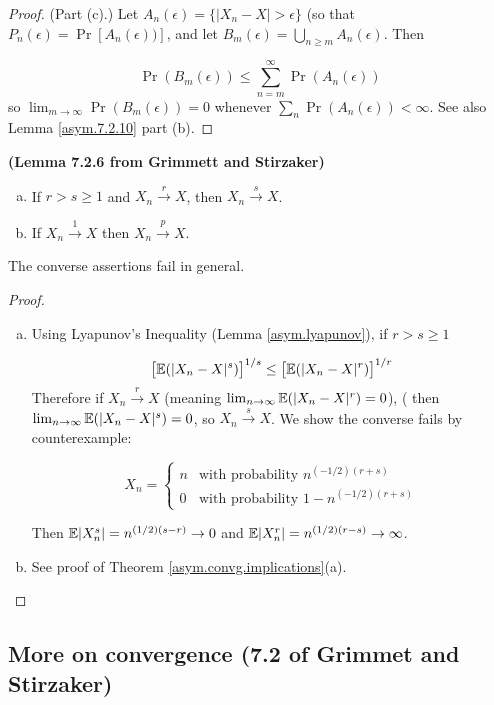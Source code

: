 \begin{proof}(Part (c).) Let \(A_n(\epsilon) = \{|X_n - X| > \epsilon\}\) (so that \(P_n(\epsilon) = \Pr[A_n(\epsilon))]\), and let \(B_m(\epsilon) = \bigcup_{n \geq m} A_n(\epsilon)\). Then

\[
\Pr(B_m(\epsilon)) \leq \sum_{n=m}^\infty \Pr(A_n(\epsilon))
\]
so \(\lim_{m \to \infty} \Pr(B_m(\epsilon)) = 0\) whenever \(\sum_n \Pr(A_n(\epsilon)) < \infty\). See also Lemma \ref{asym.7.2.10} part (b).\end{proof}

\begin{lemma}\label{asym.7.2.6} \textbf{(Lemma 7.2.6 from Grimmett and Stirzaker)} 
\begin{enumerate}[(a)]
\item If \(r > s \geq 1\) and \(X_n \xrightarrow{r} X\), then \(X_n \xrightarrow{s} X\).
\item If \(X_n \xrightarrow{1} X\) then \(X_n \xrightarrow{p} X\). 
\end{enumerate}
The converse assertions fail in general.
\end{lemma}

\begin{proof}
\begin{enumerate}[(a)]
\item
Using Lyapunov's Inequality (Lemma \ref{asym.lyapunov}), if \(r > s \geq 1\)

\[
\big[ \mathbb{E}(|X_n - X|^s) \big]^{1/s} \leq \big[ \mathbb{E}(|X_n - X|^r) \big]^{1/r}
\]
Therefore if \(X_n \xrightarrow{r} X\) (meaning \(\lim_{n \to \infty} \mathbb{E}(|X_n - X|^r) = 0\)), ( then  \(\lim_{n \to \infty} \mathbb{E}(|X_n - X|^s) = 0\), so \(X_n \xrightarrow{s} X\). We show the converse fails by counterexample:

\[
X_n = \begin{cases}
n & \text{with probability } n^{(-1/2)(r+s)} \\
0 & \text{with probability } 1 -  n^{(-1/2)(r+s)}
\end{cases}
\]

Then \(\mathbb{E}|X_n^s| = n^{(1/2)(s-r)} \to 0\) and \(\mathbb{E}|X_n^r| = n^{(1/2)(r-s)} \to \infty\).

\item See proof of Theorem \ref{asym.convg.implications}(a).

\end{enumerate}
\end{proof}


\subsection{More on convergence (7.2 of Grimmet and Stirzaker)}

